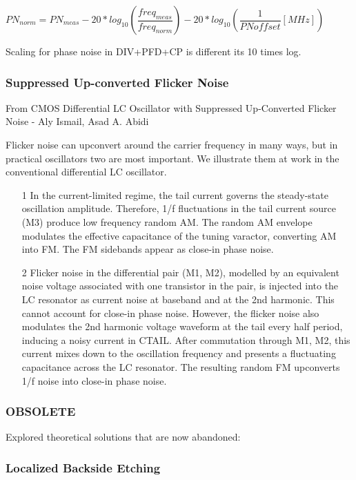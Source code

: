 $PN_{norm}=PN_{meas}-20*log_{10}(\dfrac{freq_{meas}}{freq_{norm}})-20*log_{10}(\dfrac{1}{PNoffset}[MHz])$

Scaling for phase noise in DIV+PFD+CP is different its 10 times log.

\subsubsection*{Suppressed Up-converted Flicker Noise}

From CMOS Differential LC Oscillator with Suppressed Up-Converted Flicker Noise - Aly Ismail, Asad A. Abidi

\begin{info}
	Flicker noise can upconvert around the carrier frequency in many ways, but in practical oscillators two are most important. We illustrate them at work in the conventional differential LC oscillator.
	\begin{itemize}
		\item [1] In the current-limited regime, the tail current governs the steady-state oscillation amplitude. Therefore, 1/f fluctuations in the tail current source (M3) produce low frequency random AM. The random AM envelope modulates the effective capacitance of the tuning varactor, converting AM into FM. The FM sidebands appear as close-in phase noise. 
		\item [2] Flicker noise in the differential pair (M1, M2), modelled by an equivalent noise voltage associated with one transistor in the pair, is injected into the LC resonator as current noise at baseband and at the 2nd harmonic. This cannot account for close-in phase noise. However, the flicker noise also modulates the 2nd harmonic voltage waveform at the tail every half period, inducing a noisy current in CTAIL. After commutation through M1, M2, this current mixes down to the oscillation frequency and presents a fluctuating capacitance across the LC resonator. The resulting random FM upconverts 1/f noise into close-in phase noise.
	\end{itemize}
\end{info}

\subsubsection*{OBSOLETE}

Explored theoretical solutions that are now abandoned:

\subsubsection*{Localized Backside Etching}

